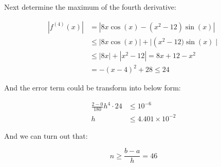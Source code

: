 \begin{solution}
Next determine the maximum of the fourth derivative:


\begin{equation*}
\begin{aligned}
\left|f^{(4)}(x)\right| &=\left|8 x \cos (x)-\left(x^{2}-12\right) \sin (x)\right| \\
& \leq|8 x \cos (x)|+\mid\left(x^{2}-12) \sin (x) \mid\right.\\
& \leq|8 x|+\left|x^{2}-12\right|=8 x+12-x^{2} \\
&=-(x-4)^{2}+28 \leq 24
\end{aligned}
\end{equation*}


And the error term could be transform into below form:


\begin{equation}
\begin{aligned}
	\frac{2-0}{180} h^{4} \cdot 24 &\leq 10^{-6}\\
	h & \leq 4.401 \times 10^{-2}
\end{aligned}
\end{equation}

And we can turn out that:


\begin{equation}
n \geq \frac{b-a}{h}=4 6
\end{equation}



















\end{solution}




















